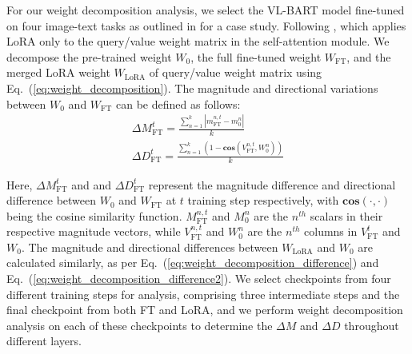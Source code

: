\documentclass{article}
\theoremstyle{plain}
\theoremstyle{definition}
\theoremstyle{remark}
\def\authornote#1#2#3{{\textcolor{#2}{\textsl{\small[#1: #3]}}}}
\newcommand{\PM}[1]{\authornote{Pavlo}{blue}{#1}}
\begin{document}
For our weight decomposition analysis, we select the VL-BART model fine-tuned on four image-text tasks as outlined in \cite{sung2022vladapter} for a case study. Following \cite{sung2022vladapter}, which applies LoRA only to the query/value weight matrix in the self-attention module. We decompose the pre-trained weight $W_0$, the full fine-tuned weight $W_{\text{FT}}$, and the merged LoRA weight $W_{\text{LoRA}}$ of query/value weight matrix using Eq.~(\ref{eq:weight_decomposition}). The magnitude and directional variations between $W_0$ and $W_{\text{FT}}$ can be defined as follows:
\begin{align}
\label{eq:weight_decomposition_difference}
\Delta M_{\text{FT}}^{t} = \frac{\sum_{n = 1}^{k} |m_{\text{FT}}^{n,t} - m_0^{n}|}{k}\\
\label{eq:weight_decomposition_difference2}
\Delta D_{\text{FT}}^{t} = \frac{\sum_{n = 1}^{k} (1- \mathbf{cos}(V_{\text{FT}}^{n,t}, W_{0}^{n}))}{k}
\end{align}


Here, $\Delta M_{\text{FT}}^{t}$ and and $\Delta D_{\text{FT}}^{t}$ represent the magnitude difference and directional difference between $W_0$ and $W_{\text{FT}}$ at $t$ training step respectively, with $\mathbf{cos}(\cdot,\cdot)$ being the cosine similarity function. $M_{\text{FT}}^{n,t}$ and $M_0^{n}$ are the $n^{th}$ scalars in their respective magnitude vectors, while $V_{\text{FT}}^{n,t}$ and $W_{0}^{n}$ are the $n^{th}$ columns in $V_{\text{FT}}^{t}$ and $W_{0}$. The magnitude and directional differences between $W_{\text{LoRA}}$ and $W_0$ are calculated similarly, as per Eq.~(\ref{eq:weight_decomposition_difference}) and Eq.~(\ref{eq:weight_decomposition_difference2}). We select checkpoints from four different training steps for analysis, comprising three intermediate steps and the final checkpoint from both FT and LoRA, and we perform weight decomposition analysis on each of these checkpoints to determine the $\Delta M$ and $\Delta D$ throughout different layers.
\end{document}
